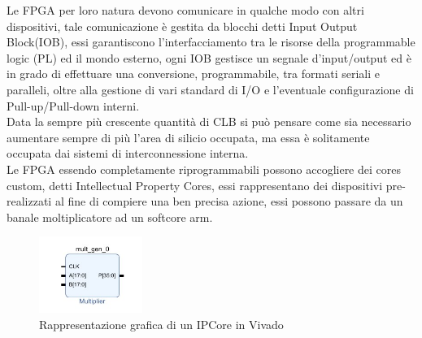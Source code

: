 Le FPGA per loro natura devono comunicare in qualche modo con altri dispositivi, tale comunicazione è gestita da blocchi detti Input Output Block(IOB), essi garantiscono l'interfacciamento tra le risorse della programmable logic (PL) ed il mondo esterno, ogni IOB gestisce un segnale d'input/output ed è in grado di effettuare una conversione, programmabile, tra formati seriali e paralleli, oltre alla gestione di vari standard di I/O e l'eventuale configurazione di Pull-up/Pull-down interni.\\
Data la sempre più crescente quantità di CLB si può pensare come sia necessario aumentare sempre di più l'area di silicio occupata, ma essa è solitamente occupata dai sistemi di interconnessione interna.\\
Le FPGA essendo completamente riprogrammabili possono accogliere dei cores custom, detti Intellectual Property Cores, essi rappresentano dei dispositivi pre-realizzati al fine di compiere una ben precisa azione, essi possono passare da un banale moltiplicatore ad un softcore arm.
\begin{figure}[h]
\centering
\includegraphics[width=0.3\textwidth]{images/IPcores.jpg}
\caption{Rappresentazione grafica di un IPCore in Vivado}
\end{figure}\\
